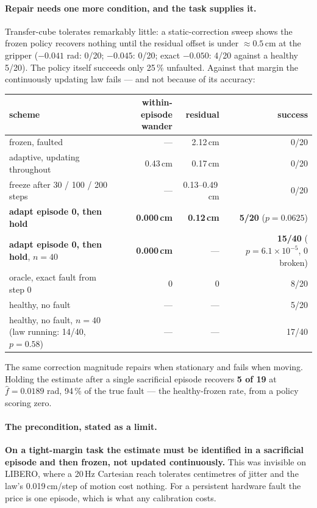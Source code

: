\documentclass[11pt,a4paper]{article}
\begin{document}
\paragraph{Repair needs one more condition, and the task supplies it.}
Transfer-cube tolerates remarkably little: a static-correction sweep shows the frozen policy
recovers nothing until the residual offset is under $\approx 0.5$\,cm at the gripper
($-0.041$ rad: 0/20; $-0.045$: 0/20; exact $-0.050$: 4/20 against a healthy 5/20). The
policy itself succeeds only 25\,\% unfaulted. Against that margin the continuously updating
law fails --- and not because of its accuracy:

\begin{center}
\begin{tabular}{lrrr}
\toprule
scheme & within-episode wander & residual & success \\
\midrule
frozen, faulted & --- & 2.12\,cm & 0/20 \\
adaptive, updating throughout & 0.43\,cm & 0.17\,cm & 0/20 \\
freeze after 30 / 100 / 200 steps & --- & 0.13--0.49\,cm & 0/20 \\
\textbf{adapt episode 0, then hold} & \textbf{0.000\,cm} & \textbf{0.12\,cm} & \textbf{5/20} ($p=0.0625$) \\
\textbf{adapt episode 0, then hold}, $n=40$ & \textbf{0.000\,cm} & --- & \textbf{15/40} ($p=6.1\times10^{-5}$, 0 broken) \\
oracle, exact fault from step 0 & 0 & 0 & 8/20 \\
healthy, no fault & --- & --- & 5/20 \\
healthy, no fault, $n=40$ (law running: 14/40, $p=0.58$) & --- & --- & 17/40 \\
\bottomrule
\end{tabular}
\end{center}

The same correction magnitude repairs when stationary and fails when moving. Holding the
estimate after a single sacrificial episode recovers \textbf{5 of 19} at
$\hat f = 0.0189$ rad, 94\,\% of the true fault --- the healthy-frozen rate, from a policy
scoring zero.

\paragraph{The precondition, stated as a limit.}
\textbf{On a tight-margin task the estimate must be identified in a sacrificial episode and
then frozen, not updated continuously.} This was invisible on LIBERO, where a 20\,Hz
Cartesian reach tolerates centimetres of jitter and the law's 0.019\,cm/step of motion cost
nothing. For a persistent hardware fault the price is one episode, which is what any
calibration costs.
\end{document}
